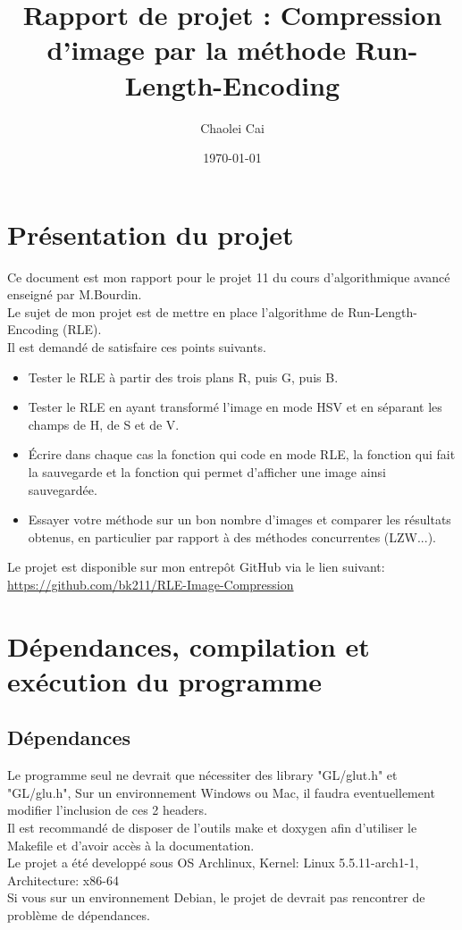 \documentclass[12pt, letterpaper]{article}
\title{Rapport de projet : Compression d'image par la méthode Run-Length-Encoding}
\author{Chaolei Cai
\\
    \multicolumn{1}{
        p{.7\textwidth}}{\centering\emph{Université Paris Vincennes St-Denis\\
  UFR mathématiques, informatique, technologies sciences de l'information\\}
  L3 Informatique}
}
\date{\today}
\begin{document}
\begin{titlepage}
    \maketitle
\end{titlepage}

\tableofcontents

\section{Présentation du projet}
Ce document est mon rapport pour le projet 11 du cours d'algorithmique avancé enseigné par M.Bourdin.\\
Le sujet de mon projet est de mettre en place l'algorithme de Run-Length-Encoding (RLE).\\
Il est demandé de satisfaire ces points suivants.
\begin{itemize}
    \item Tester le RLE à partir des trois plans R, puis G, puis B. 
    \item Tester le RLE en ayant transformé l'image en mode HSV et en séparant les champs de H, de S et de V. 
    \item Écrire dans chaque cas la fonction qui code en mode RLE, la fonction qui fait la sauvegarde et la fonction qui permet d'afficher une image ainsi sauvegardée. 
    \item Essayer votre méthode sur un bon nombre d'images et comparer les résultats obtenus, en particulier par rapport à des méthodes concurrentes (LZW...).
\end{itemize}
Le projet est disponible sur mon entrepôt GitHub via le lien suivant:\\
\url{https://github.com/bk211/RLE-Image-Compression}

\section{Dépendances, compilation et exécution du programme}
\subsection{Dépendances}
Le programme seul ne devrait que nécessiter des library "GL/glut.h" et "GL/glu.h", 
Sur un environnement Windows ou Mac, il faudra eventuellement modifier l'inclusion de ces 2 headers.\\
Il est recommandé de disposer de l'outils make et doxygen afin d'utiliser le Makefile et d'avoir accès à la documentation.\\
Le projet a été developpé sous OS Archlinux, Kernel: Linux 5.5.11-arch1-1, Architecture: x86-64\\
Si vous sur un environnement Debian, le projet de devrait pas rencontrer de problème de dépendances.
\end{document}

